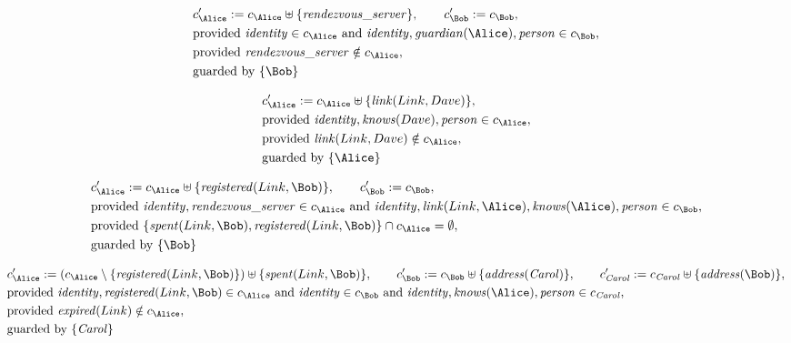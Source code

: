 \begin{align*}
&
c'_
{
\Alice
}
 := 
c_
{
\Alice
}
 \uplus 
\{
\mathit{\detokenize{
rendezvous_server
}}
\}
, \qquad 
c'_
{
\Bob
}
 := 
c_
{
\Bob
}
,\\
&
\text{provided } 
\mathit{\detokenize{
identity
}}
 \in c_
{
\Alice
}
 \text{ and } 
\mathit{\detokenize{
identity
}}
,
\mathit{\detokenize{
guardian
}}
(
\Alice
)
,
\mathit{\detokenize{
person
}}
 \in c_
{
\Bob
}
,\\
&
\text{provided } 
\mathit{\detokenize{
rendezvous_server
}}
 \notin c_
{
\Alice
}
,\\
&
\text{guarded by } \{
\Bob
\}
\end{align*}

\begin{align*}
&
c'_
{
\Alice
}
 := 
c_
{
\Alice
}
 \uplus 
\{
\mathit{\detokenize{
link
}}
(
Link
,
Dave
)
\}
,\\
&
\text{provided } 
\mathit{\detokenize{
identity
}}
,
\mathit{\detokenize{
knows
}}
(
Dave
)
,
\mathit{\detokenize{
person
}}
 \in c_
{
\Alice
}
,\\
&
\text{provided } 
\mathit{\detokenize{
link
}}
(
Link
,
Dave
)
 \notin c_
{
\Alice
}
,\\
&
\text{guarded by } \{
\Alice
\}
\end{align*}

\begin{align*}
&
c'_
{
\Alice
}
 := 
c_
{
\Alice
}
 \uplus 
\{
\mathit{\detokenize{
registered
}}
(
Link
,
\Bob
)
\}
, \qquad 
c'_
{
\Bob
}
 := 
c_
{
\Bob
}
,\\
&
\text{provided } 
\mathit{\detokenize{
identity
}}
,
\mathit{\detokenize{
rendezvous_server
}}
 \in c_
{
\Alice
}
 \text{ and } 
\mathit{\detokenize{
identity
}}
,
\mathit{\detokenize{
link
}}
(
Link
,
\Alice
)
,
\mathit{\detokenize{
knows
}}
(
\Alice
)
,
\mathit{\detokenize{
person
}}
 \in c_
{
\Bob
}
,\\
&
\text{provided } 
\{
\mathit{\detokenize{
spent
}}
(
Link
,
\Bob
)
,
\mathit{\detokenize{
registered
}}
(
Link
,
\Bob
)
\}
 \cap c_
{
\Alice
}
 = \emptyset
,\\
&
\text{guarded by } \{
\Bob
\}
\end{align*}

\begin{align*}
&
c'_
{
\Alice
}
 := 
(c_
{
\Alice
}
 \setminus 
\{
\mathit{\detokenize{
registered
}}
(
Link
,
\Bob
)
\}
) \uplus 
\{
\mathit{\detokenize{
spent
}}
(
Link
,
\Bob
)
\}
, \qquad 
c'_
{
\Bob
}
 := 
c_
{
\Bob
}
 \uplus 
\{
\mathit{\detokenize{
address
}}
(
\mathit{Carol}
)
\}
, \qquad 
c'_
{
\mathit{Carol}
}
 := 
c_
{
\mathit{Carol}
}
 \uplus 
\{
\mathit{\detokenize{
address
}}
(
\Bob
)
\}
,\\
&
\text{provided } 
\mathit{\detokenize{
identity
}}
,
\mathit{\detokenize{
registered
}}
(
Link
,
\Bob
)
 \in c_
{
\Alice
}
 \text{ and } 
\mathit{\detokenize{
identity
}}
 \in c_
{
\Bob
}
 \text{ and } 
\mathit{\detokenize{
identity
}}
,
\mathit{\detokenize{
knows
}}
(
\Alice
)
,
\mathit{\detokenize{
person
}}
 \in c_
{
\mathit{Carol}
}
,\\
&
\text{provided } 
\mathit{\detokenize{
expired
}}
(
Link
)
 \notin c_
{
\Alice
}
,\\
&
\text{guarded by } \{
\mathit{Carol}
\}
\end{align*}
